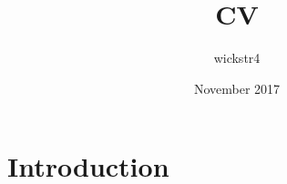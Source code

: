 \documentclass{article}
\title{CV}
\author{wickstr4 }
\date{November 2017}
\begin{document}
\maketitle

\section{Introduction}
\end{document}
